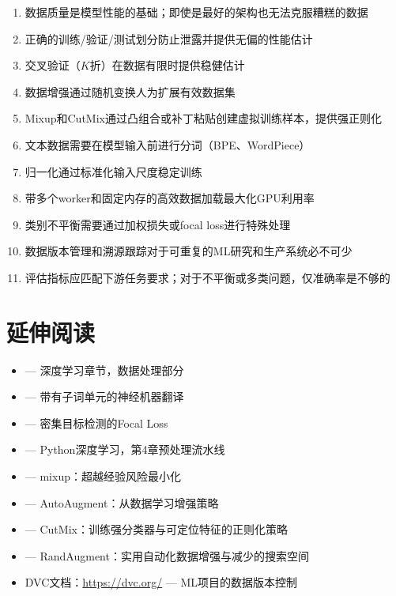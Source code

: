 \begin{enumerate}
    \item 数据质量是模型性能的基础；即使是最好的架构也无法克服糟糕的数据
    \item 正确的训练/验证/测试划分防止泄露并提供无偏的性能估计
    \item 交叉验证（$K$折）在数据有限时提供稳健估计
    \item 数据增强通过随机变换人为扩展有效数据集
    \item Mixup和CutMix通过凸组合或补丁粘贴创建虚拟训练样本，提供强正则化
    \item 文本数据需要在模型输入前进行分词（BPE、WordPiece）
    \item 归一化通过标准化输入尺度稳定训练
    \item 带多个worker和固定内存的高效数据加载最大化GPU利用率
    \item 类别不平衡需要通过加权损失或focal loss进行特殊处理
    \item 数据版本管理和溯源跟踪对于可重复的ML研究和生产系统必不可少
    \item 评估指标应匹配下游任务要求；对于不平衡或多类问题，仅准确率是不够的
\end{enumerate}

\section{延伸阅读}

\begin{itemize}
    \item \cite{goodfellow2016deep} --- 深度学习章节，数据处理部分
    \item \cite{sennrich2016neural} --- 带有子词单元的神经机器翻译
    \item \cite{lin2017focal} --- 密集目标检测的Focal Loss
    \item \cite{chollet2017deep} --- Python深度学习，第4章预处理流水线
    \item \cite{zhang2018mixup} --- mixup：超越经验风险最小化
    \item \cite{cubuk2019autoaugment} --- AutoAugment：从数据学习增强策略
    \item \cite{yun2019cutmix} --- CutMix：训练强分类器与可定位特征的正则化策略
    \item \cite{cubuk2020randaugment} --- RandAugment：实用自动化数据增强与减少的搜索空间
    \item DVC文档：\url{https://dvc.org/} --- ML项目的数据版本控制
\end{itemize}

